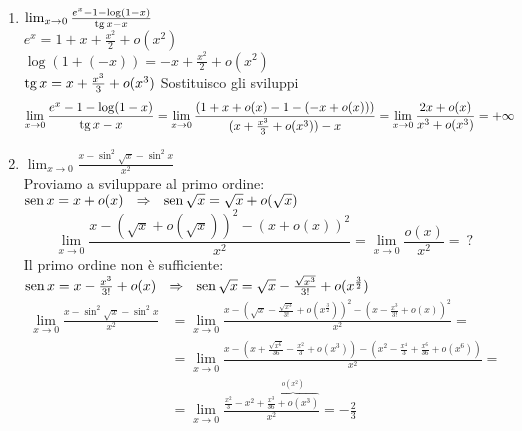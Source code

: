 \documentclass{article}
\begin{document}
\begin{enumerate}[label=\textbf{Esercizio 
    8.\arabic*.},itemindent=*]
\begin{enumerate}
        \[
        \begin{align*}
            \lim_{x\to 0}\frac{e^{x^2}-\cos x-\frac{3}{2}x^2}{x^4}&=\lim_{x\to 0}\frac{\left( 1+x^2+\frac{x^4}{2!}+o(x^4) \right)-\left( 1-\frac{x^2}{2}+\frac{x^4}{24}+o(x^4) \right)-\frac{3}{2}x^2}{x^4}=\\&=\lim_{x\to 0}\frac{11}{24}\cdot \frac{\cancel{x^4}}{\cancel{x^4}}+\cancel{\frac{o(x^4)}{x^4}}=\frac{11}{24}
        \end{align*}\]
        \item $\lim_{x\to 0}\frac{e^x-1-\log(1-x)}{\operatorname{tg} x-x}$
        \\ $e^x=1+x+\frac{x^2}{2}+o(x^2)$
        \\ $\log(1+(-x))=-x+\frac{x^2}{2}+o(x^2)$
        \\ $\operatorname{tg} x=x+\frac{x^3}{3}+o(x^3)$
        Sostituisco gli sviluppi
        \[\begin{align*}
            \lim_{x\to 0}\frac{e^x-1-\log(1-x)}{\operatorname{tg} x-x}&=\lim_{x\to 0} \frac{(1+x+o(x)-1-(-x+o(x)))}{(x+\frac{x^3}{3}+o(x^3))-x}=\lim_{x\to 0}\frac{2x+o(x)}{x^3+o(x^3)}=+\infty
        \end{align*}\]
        \item $\lim_{x\to 0}\frac{x-\sin^2 \sqrt{x}-\sin^2x}{x^2}$
        \\Proviamo a sviluppare al primo ordine: $\operatorname{sen} x=x+o(x) ~~\Rightarrow~~\operatorname{sen} \sqrt{x}=\sqrt{x}+o(\sqrt{x})$
        \[\lim_{x\to 0}\frac{x-(\sqrt{x}+o(\sqrt{x}))^2-(x+o(x))^2}{x^2}=\lim_{x\to 0}\frac{o(x)}{x^2}=\:?\]
        Il primo ordine non è sufficiente: $\operatorname{sen} x=x-\frac{x^3}{3!}+o(x) ~~\Rightarrow~~\operatorname{sen} \sqrt{x}=\sqrt{x}-\frac{\sqrt{x^3}}{3!}+o(x^\frac{3}{2})$
        \[\begin{align*}
            \lim_{x\to 0}\frac{x-\sin^2 \sqrt{x}-\sin^2x}{x^2}&=\lim_{x\to 0} \frac{x-\left( \sqrt{x}-\frac{\sqrt{x^3}}{3!}+o(x^\frac{3}{2}) \right)^2-\left( x-\frac{x^3}{3!}+o(x) \right)^2}{x^2}=\\&=\lim_{x\to 0}\frac{x-\left( x+\frac{\sqrt{x^6}}{36}-\frac{x^2}{3} +o(x^3)\right)-\left( x^2-\frac{x^4}{3}+\frac{x^6}{36}+o(x^6) \right)}{x^2}=\\&=\lim_{x\to 0}\frac{\frac{x^2}{3}-x^2+\overbrace{\frac{x^3}{36}+o(x^3)}^{o(x^2)}}{x^2}=-\frac{2}{3}
        \end{align*}\]


\end{enumerate}
\end{enumerate}
\end{document}
